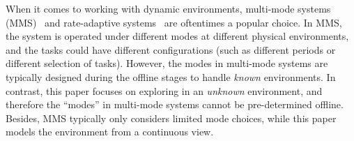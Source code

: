     When it comes to working with dynamic environments, multi-mode systems (MMS)~\cite{Huang2015TechniquesFS, Toma2018ImplementationAE} and rate-adaptive systems~\cite{Buttazzo2014RateadaptiveTM} are oftentimes a popular choice. In MMS, the system is operated under different modes at different physical environments, and the tasks could have different configurations (such as different periods or different selection of tasks). However, the modes in multi-mode systems are typically designed during the offline stages to handle \textit{known} environments. In contrast, this paper focuses on exploring in an \textit{unknown} environment, and therefore the ``modes'' in multi-mode systems cannot be pre-determined offline. Besides, MMS typically only considers limited mode choices, while this paper models the environment from a continuous view.


